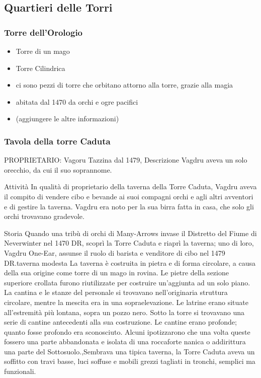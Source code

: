 \documentclass{article}
\begin{document}
\begin{landscape}
      
       
   
    
\end{landscape}

          \subsection{Quartieri delle Torri}
              \subsubsection{Torre dell'Orologio}
\begin{itemize}
    \item Torre di un mago
    \item Torre Cilindrica
    \item ci sono pezzi di torre che orbitano attorno alla torre, grazie alla magia
    \item abitata dal 1470 da orchi e ogre pacifici
    \item (aggiungere le altre informazioni)
\end{itemize}
              \subsubsection{Tavola della torre Caduta}
PROPRIETARIO: Vagoru Tazzina dal 1479, Descrizione
Vagdru aveva un solo orecchio, da cui il suo soprannome.


Attività
In qualità di proprietario della taverna della Torre Caduta, Vagdru aveva il compito di vendere cibo e bevande ai suoi compagni orchi e agli altri avventori e di gestire la taverna. Vagdru era noto per la sua birra fatta in casa, che solo gli orchi trovavano gradevole.

Storia
Quando una tribù di orchi di Many-Arrows invase il Distretto del Fiume di Neverwinter nel 1470 DR, scoprì la Torre Caduta e riaprì la taverna; uno di loro, Vagdru One-Ear, assunse il ruolo di barista e venditore di cibo nel 1479 DR.taverna modesta
La taverna è costruita in pietra e di forma circolare, a causa della sua origine come torre di un mago in rovina. Le pietre della sezione superiore crollata furono riutilizzate per costruire un'aggiunta ad un solo piano. La cantina e le stanze del personale si trovavano nell'originaria struttura circolare, mentre la mescita era in una sopraelevazione. Le latrine erano situate all'estremità più lontana, sopra un pozzo nero. Sotto la torre si trovavano una serie di cantine antecedenti alla sua costruzione. Le cantine erano profonde; quanto fosse profondo era sconosciuto. Alcuni ipotizzarono che una volta queste fossero una parte abbandonata e isolata di una roccaforte nanica o addirittura una parte del Sottosuolo.,Sembrava una tipica taverna, la Torre Caduta aveva un soffitto con travi basse, luci soffuse e mobili grezzi tagliati in tronchi, semplici ma funzionali.
\end{document}
